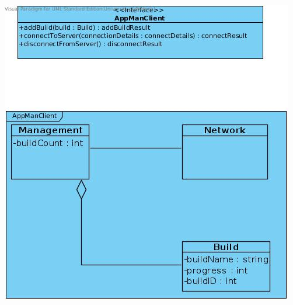 \documentclass[a4paper,12pt,final]{article}
\begin{document}
\begin{center}
\includegraphics[scale=0.5]{AppManClientDiagram.jpg} 
\end{center}
\end{document}
